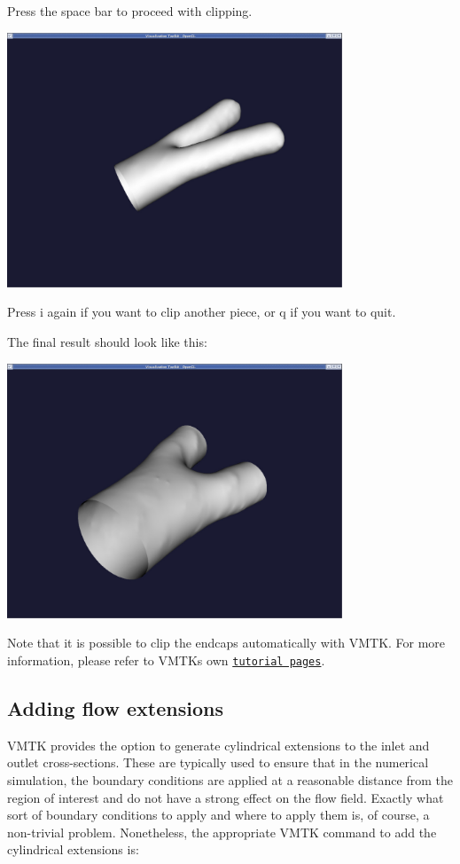 Press the space bar to proceed with clipping.

 
\begin{DoxyImageNoCaption}
  \mbox{\includegraphics[width=0.75\textwidth]{clip1}}
\end{DoxyImageNoCaption}


Press i again if you want to clip another piece, or q if you want to quit.

The final result should look like this\+:

 
\begin{DoxyImageNoCaption}
  \mbox{\includegraphics[width=0.75\textwidth]{clip2}}
\end{DoxyImageNoCaption}


Note that it is possible to clip the endcaps automatically with V\+M\+TK. For more information, please refer to V\+M\+TK\textquotesingle{}s own \href{http://www.vmtk.org}{\tt tutorial pages}.



 

\hypertarget{index_add_extensions}{}\subsection{Adding flow extensions}\label{index_add_extensions}
V\+M\+TK provides the option to generate cylindrical extensions to the inlet and outlet cross-\/sections. These are typically used to ensure that in the numerical simulation, the boundary conditions are applied at a reasonable distance from the region of interest and do not have a strong effect on the flow field. Exactly what sort of boundary conditions to apply and where to apply them is, of course, a non-\/trivial problem. Nonetheless, the appropriate V\+M\+TK command to add the cylindrical extensions is\+:


